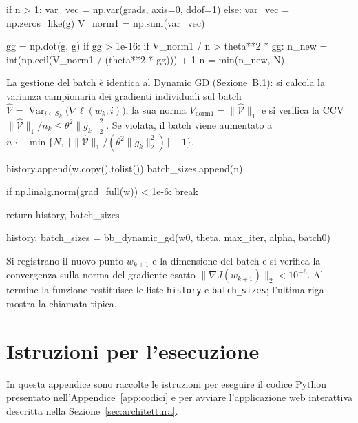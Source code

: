 \documentclass[a4paper,12pt]{article}
\numberwithin{equation}{section}
\numberwithin{figure}{section}
\numberwithin{table}{section}
\begin{document}
\begin{pythoncode}[title= BB-CCV]

        if n > 1:
            var_vec = np.var(grads, axis=0, ddof=1)
        else:
            var_vec = np.zeros_like(g)
        V_norm1 = np.sum(var_vec)

        gg = np.dot(g, g)
        if gg > 1e-16:
            if V_norm1 / n > theta**2 * gg:
                n_new = int(np.ceil(V_norm1 / (theta**2 * gg))) + 1
                n = min(n_new, N)
\end{pythoncode}

La gestione del batch è identica al Dynamic GD (Sezione~B.1): si calcola la
varianza campionaria dei gradienti individuali sul batch
$\widehat{\mathcal{V}} = \operatorname{Var}_{i\in\mathcal{S}_k}\bigl(\nabla\ell(w_k;i)\bigr)$,
la sua norma $V_{\text{norm1}} = \|\widehat{\mathcal{V}}\|_1$ e si verifica la CCV
$\|\widehat{\mathcal{V}}\|_1 / n_k \le \theta^2 \|g_k\|_2^2$. Se violata, il batch
viene aumentato a
$n \leftarrow \min\bigl\{N,\ \lceil \|\widehat{\mathcal{V}}\|_1/(\theta^2\|g_k\|_2^2)\rceil + 1\bigr\}$.

\begin{pythoncode}[title= BB-CCV]

        history.append(w.copy().tolist())
        batch_sizes.append(n)

        if np.linalg.norm(grad_full(w)) < 1e-6:
            break

    return history, batch_sizes

history, batch_sizes = bb_dynamic_gd(w0, theta, max_iter, alpha, batch0)
\end{pythoncode}

Si registrano il nuovo punto $w_{k+1}$ e la dimensione del batch e si verifica
la convergenza sulla norma del gradiente esatto
$\|\nabla J(w_{k+1})\|_2 < 10^{-6}$. Al termine la funzione restituisce le liste
\texttt{history} e \texttt{batch\_sizes}; l'ultima riga mostra la chiamata tipica.

\section{Istruzioni per l'esecuzione}\label{app:istruzioni}

In questa appendice sono raccolte le istruzioni per eseguire il codice
Python presentato nell'Appendice~\ref{app:codici} e per avviare
l'applicazione web interattiva descritta nella Sezione~\ref{sec:architettura}.
\end{document}
